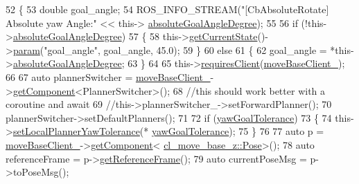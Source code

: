 \begin{DoxyCode}
52 \{
53     \textcolor{keywordtype}{double} goal\_angle;
54     ROS\_INFO\_STREAM(\textcolor{stringliteral}{"[CbAbsoluteRotate] Absolute yaw Angle:"} << this->
      \hyperlink{classcl__move__base__z_1_1CbAbsoluteRotate_ad5d0e21549940444e1cb525cda73329a}{absoluteGoalAngleDegree});
55 
56     \textcolor{keywordflow}{if} (!this->\hyperlink{classcl__move__base__z_1_1CbAbsoluteRotate_ad5d0e21549940444e1cb525cda73329a}{absoluteGoalAngleDegree})
57     \{
58         this->\hyperlink{classsmacc_1_1SmaccClientBehavior_abf6773e4dd948f932f11a346dd6e7c2c}{getCurrentState}()->\hyperlink{classsmacc_1_1ISmaccState_a4f2ff8e3eda8aa9bbb60c8ff17d0def1}{param}(\textcolor{stringliteral}{"goal\_angle"}, goal\_angle, 45.0);
59     \}
60     \textcolor{keywordflow}{else}
61     \{
62         goal\_angle = *this->\hyperlink{classcl__move__base__z_1_1CbAbsoluteRotate_ad5d0e21549940444e1cb525cda73329a}{absoluteGoalAngleDegree};
63     \}
64 
65     this->\hyperlink{classsmacc_1_1SmaccClientBehavior_a917f001e763a1059af337bf4e164f542}{requiresClient}(\hyperlink{classcl__move__base__z_1_1CbAbsoluteRotate_a8ddbef73316ff96f30493b28b5627e35}{moveBaseClient\_});
66 
67     \textcolor{keyword}{auto} plannerSwitcher = \hyperlink{classcl__move__base__z_1_1CbAbsoluteRotate_a8ddbef73316ff96f30493b28b5627e35}{moveBaseClient\_}->\hyperlink{classsmacc_1_1ISmaccClient_adef78db601749ca63c19e74a27cb88cc}{getComponent}<PlannerSwitcher>();
68     \textcolor{comment}{//this should work better with a coroutine and await}
69     \textcolor{comment}{//this->plannerSwitcher\_->setForwardPlanner();}
70     plannerSwitcher->setDefaultPlanners();
71 
72     \textcolor{keywordflow}{if} (\hyperlink{classcl__move__base__z_1_1CbAbsoluteRotate_a8d8b5b9c2c821efe101bb07c96c4bdd3}{yawGoalTolerance})
73     \{
74         this->\hyperlink{classcl__move__base__z_1_1CbAbsoluteRotate_aba8d93d615ccd43acd0684f8e88e2209}{setLocalPlannerYawTolerance}(*
      \hyperlink{classcl__move__base__z_1_1CbAbsoluteRotate_a8d8b5b9c2c821efe101bb07c96c4bdd3}{yawGoalTolerance});
75     \}
76 
77     \textcolor{keyword}{auto} p = \hyperlink{classcl__move__base__z_1_1CbAbsoluteRotate_a8ddbef73316ff96f30493b28b5627e35}{moveBaseClient\_}->\hyperlink{classsmacc_1_1ISmaccClient_adef78db601749ca63c19e74a27cb88cc}{getComponent}<
      \hyperlink{classcl__move__base__z_1_1Pose}{cl\_move\_base\_z::Pose}>();
78     \textcolor{keyword}{auto} referenceFrame = p->\hyperlink{classcl__move__base__z_1_1Pose_af8c2dc151e74aa8da6b283d1c8563051}{getReferenceFrame}();
79     \textcolor{keyword}{auto} currentPoseMsg = p->toPoseMsg();

\end{DoxyCode}
